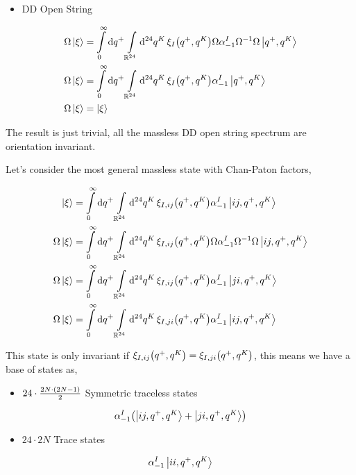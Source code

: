 \begin{itemize}
    \item DD Open String
\end{itemize}
\begin{align*}
    \Omega\ket{\xi}&=\int\limits_0^\infty\dd{q^+}\int\limits_{\mathbb R^{24}}\dd[24]{q^K}\xi_{I}\qty(q^+,q^K)\Omega\alpha^I_{-1}\Omega^{-1}\Omega\ket{q^+,q^K}\\
    \Omega\ket{\xi}&=\int\limits_0^\infty\dd{q^+}\int\limits_{\mathbb R^{24}}\dd[24]{q^K}\xi_{I}\qty(q^+,q^K)\alpha^I_{-1}\ket{q^+,q^K}\\
    \Omega\ket{\xi}&=\ket\xi
\end{align*}

The result is just trivial, all the massless DD open string spectrum are orientation invariant.

\probitem{}
\label{6e}
Let's consider the most general massless state with Chan-Paton factors,

\begin{align*}
    \ket{\xi}&=\int\limits_0^\infty\dd{q^+}\int\limits_{\mathbb R^{24}}\dd[24]{q^K}\xi_{I,ij}\qty(q^+,q^K)\alpha^I_{-1}\ket{ij,q^+,q^K}\\
    \Omega\ket{\xi}&=\int\limits_0^\infty\dd{q^+}\int\limits_{\mathbb R^{24}}\dd[24]{q^K}\xi_{I,ij}\qty(q^+,q^K)\Omega\alpha^I_{-1}\Omega^{-1}\Omega\ket{ij,q^+,q^K}\\
    \Omega\ket{\xi}&=\int\limits_0^\infty\dd{q^+}\int\limits_{\mathbb R^{24}}\dd[24]{q^K}\xi_{I,ij}\qty(q^+,q^K)\alpha^I_{-1}\ket{ji,q^+,q^K}\\
    \Omega\ket{\xi}&=\int\limits_0^\infty\dd{q^+}\int\limits_{\mathbb R^{24}}\dd[24]{q^K}\xi_{I,ji}\qty(q^+,q^K)\alpha^I_{-1}\ket{ij,q^+,q^K}
\end{align*}

This state is only invariant if $\xi_{I,ij}\qty(q^+,q^K)=\xi_{I,ji}\qty(q^+,q^K)$, this means we have a base of states as,

\begin{itemize}
    \item $24\cdot\frac{2N\cdot \qty(2N-1)}{2}$ Symmetric traceless states
\end{itemize}
\begin{align*}
    \alpha^I_{-1}\qty(\ket{ij,q^+,q^K}+\ket{ji,q^+,q^K})
\end{align*}

\begin{itemize}
    \item $24\cdot 2N$ Trace states
\end{itemize}
\begin{align*}
    \alpha^I_{-1}\ket{ii,q^+,q^K}
\end{align*}

